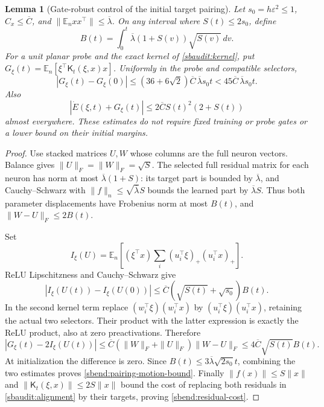 \documentclass[11pt]{article}
\newtheorem{lemma}[theorem]{Lemma}
\theoremstyle{remark}
\begin{document}
\begin{lemma}[Gate-robust control of the initial target pairing]
\label{sbend:pairing-motion}
Let $s_0=h\varepsilon^2\le1$, $C_x\le\overline C$, and
$\|\mathbb E_nxx^\top\|\le\overline\lambda$. On any interval where
$S(t)\le2s_0$, define
\[
 B(t)=\int_0^t\overline\lambda(1+S(v))\sqrt{S(v)}\,dv.
\]
For a unit planar probe and the exact kernel of
\eqref{sbaudit:kernel}, put
$G_\xi(t)=\mathbb E_n[\xi^\top\mathsf K_t(\xi,x)x]$.
Uniformly in the probe and compatible selectors,
\begin{equation}\label{sbend:pairing-motion-bound}
 |G_\xi(t)-G_\xi(0)|
 \le(36+6\sqrt2)\overline C\,\overline\lambda s_0t
 <45\overline C\,\overline\lambda s_0t.
\end{equation}
Also
\begin{equation}\label{sbend:residual-cost}
 |\dot E(\xi,t)+G_\xi(t)|
 \le2\overline C S(t)^2(2+S(t))
\end{equation}
almost everywhere. These estimates do not require fixed training or probe
gates or a lower bound on their initial margins.
\end{lemma}
\begin{proof}
Use stacked matrices $U,W$ whose columns are the full neuron vectors.
Balance gives $\|U\|_F=\|W\|_F=\sqrt S$. The selected full residual
matrix for each neuron has norm at most
$\overline\lambda(1+S)$: its target part is bounded by
$\overline\lambda$, and Cauchy--Schwarz with
$\|f\|_n\le\sqrt{\overline\lambda}S$ bounds the learned part by
$\overline\lambda S$. Thus both parameter displacements have Frobenius
norm at most $B(t)$, and $\|W-U\|_F\le2B(t)$.

Set
\[
 I_\xi(U)=\mathbb E_n\left[(\xi^\top x)
             \sum_i(u_i^\top\xi)_+(u_i^\top x)_+\right].
\]
ReLU Lipschitzness and Cauchy--Schwarz give
\[
 |I_\xi(U(t))-I_\xi(U(0))|
 \le\overline C(\sqrt{S(t)}+\sqrt{s_0})B(t).
\]
In the second kernel term replace
$(w_i^\top\xi)(w_i^\top x)$ by
$(u_i^\top\xi)(u_i^\top x)$, retaining the actual two selectors.
Their product with the latter expression is exactly the ReLU product,
also at zero preactivations. Therefore
\[
 |G_\xi(t)-2I_\xi(U(t))|
 \le\overline C(\|W\|_F+\|U\|_F)\|W-U\|_F
 \le4\overline C\sqrt{S(t)}B(t).
\]
At initialization the difference is zero. Since
$B(t)\le3\overline\lambda\sqrt{2s_0}t$, combining the two estimates
proves \eqref{sbend:pairing-motion-bound}. Finally
$\|f(x)\|\le S\|x\|$ and
$\|\mathsf K_t(\xi,x)\|\le2S\|x\|$ bound the cost of replacing both
residuals in \eqref{sbaudit:alignment} by their targets, proving
\eqref{sbend:residual-cost}.
\end{proof}
\end{document}
